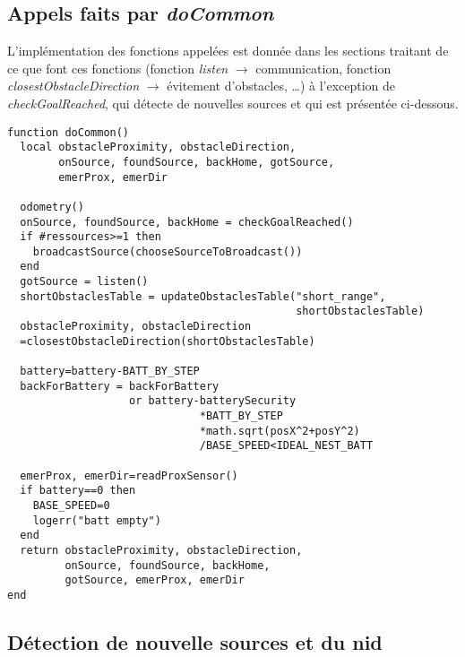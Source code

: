 \begin{subappendices}
  \subsection{Appels faits par \emph{doCommon}}

  L'implémentation des fonctions appelées est donnée dans les sections traitant de ce que font ces fonctions (fonction \emph{listen} $\rightarrow$ communication, fonction \emph{closestObstacleDirection} $\rightarrow$ évitement d'obstacles, \ldots) à l'exception de \emph{checkGoalReached}, qui détecte de nouvelles sources et qui est présentée ci-dessous.
\begin{lstlisting}[caption=fonction doCommon]
function doCommon()
  local obstacleProximity, obstacleDirection,
        onSource, foundSource, backHome, gotSource,
        emerProx, emerDir

  odometry()
  onSource, foundSource, backHome = checkGoalReached()
  if #ressources>=1 then
    broadcastSource(chooseSourceToBroadcast())
  end
  gotSource = listen()
  shortObstaclesTable = updateObstaclesTable("short_range",
                                             shortObstaclesTable)
  obstacleProximity, obstacleDirection
  =closestObstacleDirection(shortObstaclesTable)

  battery=battery-BATT_BY_STEP
  backForBattery = backForBattery
                   or battery-batterySecurity
                              *BATT_BY_STEP
                              *math.sqrt(posX^2+posY^2)
                              /BASE_SPEED<IDEAL_NEST_BATT

  emerProx, emerDir=readProxSensor()
  if battery==0 then
    BASE_SPEED=0
    logerr("batt empty")
  end
  return obstacleProximity, obstacleDirection,
         onSource, foundSource, backHome,
         gotSource, emerProx, emerDir
end
\end{lstlisting}

\subsection{Détection de nouvelle sources et du nid}


\end{subappendices}
